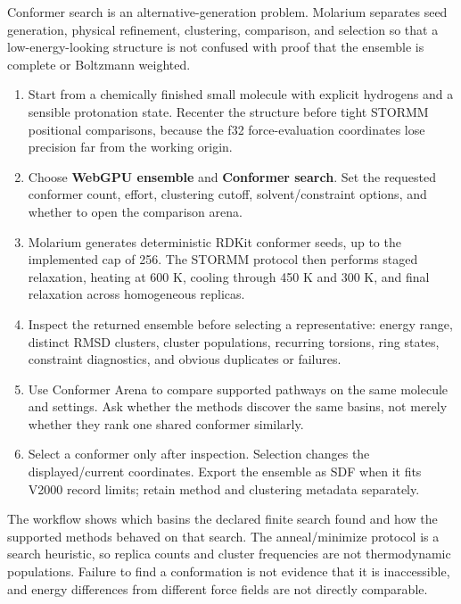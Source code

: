 \documentclass[11pt]{article}
\begin{document}

Conformer search is an alternative-generation problem. Molarium separates seed generation, physical refinement, clustering, comparison, and selection so that a low-energy-looking structure is not confused with proof that the ensemble is complete or Boltzmann weighted.


\begin{enumerate}
\item Start from a chemically finished small molecule with explicit hydrogens and a sensible protonation state. Recenter the structure before tight STORMM positional comparisons, because the f32 force-evaluation coordinates lose precision far from the working origin.
\item Choose \textbf{WebGPU ensemble} and \textbf{Conformer search}. Set the requested conformer count, effort, clustering cutoff, solvent/constraint options, and whether to open the comparison arena.
\item Molarium generates deterministic RDKit conformer seeds, up to the implemented cap of 256. The STORMM protocol then performs staged relaxation, heating at 600 K, cooling through 450 K and 300 K, and final relaxation across homogeneous replicas.
\item Inspect the returned ensemble before selecting a representative: energy range, distinct RMSD clusters, cluster populations, recurring torsions, ring states, constraint diagnostics, and obvious duplicates or failures.
\item Use Conformer Arena to compare supported pathways on the same molecule and settings. Ask whether the methods discover the same basins, not merely whether they rank one shared conformer similarly.
\item Select a conformer only after inspection. Selection changes the displayed/current coordinates. Export the ensemble as SDF when it fits V2000 record limits; retain method and clustering metadata separately.
\end{enumerate}


The workflow shows which basins the declared finite search found and how the supported methods behaved on that search. The anneal/minimize protocol is a search heuristic, so replica counts and cluster frequencies are not thermodynamic populations. Failure to find a conformation is not evidence that it is inaccessible, and energy differences from different force fields are not directly comparable.
\end{document}
